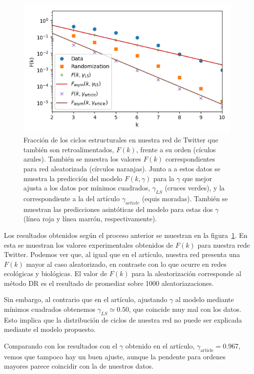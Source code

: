 \documentclass[1p]{elsarticle}
\begin{document}
\begin{figure}
    \centering
    \includegraphics[width=0.5\paperwidth]{F_sevaseviene.png}
    \caption{Fracción de los ciclos estructurales en nuestra red de Twitter que también son retroalimentados, $F(k)$, frente a su orden (cículos azules). También se muestra los valores $F(k)$ correspondientes para red aleatorizada (círculos naranjas). Junto a a estos datos se muestra la predicción del modelo $F(k, \gamma)$ para la $\gamma$ que mejor ajusta a los datos por mínimos cuadrados, $\gamma_{LS}$ (cruces verdes), y la correspondiente a la del artículo $\gamma_{article}$ (equis moradas). También se muestran las predicciones asintóticas del modelo para estas dos $\gamma$ (línea roja y línea marrón, respectivamente).}
    \label{fig:sevaseviene_F}
\end{figure}

    Los resultados obtenidos según el proceso anterior se muestran en la figura~\ref{fig:sevaseviene_F}.
    En esta se muestran los valores experimentales obtenidos de $F(k)$ para nuestra rede Twitter. 
    Podemos ver que, al igual que en el artículo, nuestra red presenta una $F(k)$ mayor al caso aleatorizado, en contraste con lo que ocurre en redes ecológicas y biológicas. 
    El valor de $F(k)$ para la aleatorización corresponde al método DR es el resultado de promediar sobre 1000 aleatoriazaciones.

    Sin embargo, al contrario que en el artículo, ajustando $\gamma$ al modelo mediante mínimos cuadrados obtenemos $\gamma_{LS} \simeq 0.50$, que coincide muy mal con los datos.
    Esto implica que la distribución de ciclos de nuestra red no puede ser explicada mediante el modelo propuesto.

    Comparando con los resultados con el $\gamma$ obtenido en el artículo, $\gamma_{\textrm{article}} = 0.967$, vemos que tampoco hay un buen ajuste, aunque la pendente para ordenes mayores parece coincidir con la de nuestros datos.
\end{document}
